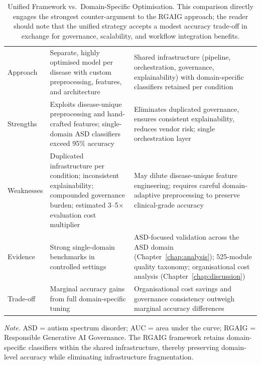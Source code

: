 {\tablestripes\tablefontsize
{}
\begin{xltabular}{\textwidth}{@{} >{\raggedright\arraybackslash}p{2.0cm} >{\raggedright\arraybackslash}p{5.9cm} >{\raggedright\arraybackslash}p{6.6cm} @{}}
\caption[Unified Framework vs.Domain-Specific Optimisation]{Unified Framework vs.\ Domain-Specific Optimisation. This comparison directly engages the strongest counter-argument to the RGAIG approach; the reader should note that the unified strategy accepts a modest accuracy trade-off in exchange for governance, scalability, and workflow integration benefits.}\label{tab:unified_vs_domainspecific} \\
\toprule
{} &  &  \\
\midrule
\endfirsthead
\endhead
\bottomrule
\endlastfoot
Approach & Separate, highly optimised model per disease with custom preprocessing, features, and architecture & Shared infrastructure (pipeline, orchestration, governance, explainability) with domain-specific classifiers retained per condition \\
\addlinespace
Strengths & Exploits disease-unique preprocessing and hand-crafted features; single-domain ASD classifiers exceed 95\% accuracy~\cite{bosl2018eeg} & Eliminates duplicated governance, ensures consistent explainability, reduces vendor risk; single orchestration layer \\
\addlinespace
Weaknesses & Duplicated infrastructure per condition; inconsistent explainability; compounded governance burden; estimated 3--5$\times$ evaluation cost multiplier & May dilute disease-unique feature engineering; requires careful domain-adaptive preprocessing to preserve clinical-grade accuracy \\
\addlinespace
Evidence & Strong single-domain benchmarks in controlled settings & ASD-focused validation across the ASD domain (Chapter~\ref{chap:analysis}); 525-module quality taxonomy; organisational cost analysis (Chapter~\ref{chap:discussion}) \\
\addlinespace
Trade-off & Marginal accuracy gains from full domain-specific tuning & Organisational cost savings and governance consistency outweigh marginal accuracy differences \\
\end{xltabular}}
\vspace{0.5em}
\noindent\textit{Note.} ASD = autism spectrum disorder;  AUC = area under the curve; RGAIG = Responsible Generative AI Governance. The RGAIG framework retains domain-specific classifiers within the shared infrastructure, thereby preserving domain-level accuracy while eliminating infrastructure fragmentation.

